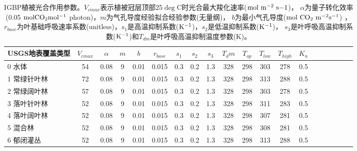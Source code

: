     \begin{sidewaystable}[]
        \centering
        \caption{IGBP植被光合作用参数。$V_{cmax}$表示植被冠层顶部25$\deg$C时光合最大羧化速率($\rm mol\ m^{-2}\ s{-1}$)，
        $\alpha$为量子转化效率(0.05 $\rm mol CO_2 mol^{-1}$ photon)，$m$为气孔导度经验拟合经验参数(无量纲)，
        $b$为最小气孔导度($\rm mol\ CO_2\ m^{-2}s^{-1}$) ，
        $r_{base}$为叶基础呼吸速率系数(unitless)，$s_1$是高温抑制系数($\rm K^{-1}$)，$s_2$是低温抑制系数($\rm K^{-1}$)，
        $s_3$是叶呼吸高温抑制系数($\rm K^{-1}$)和$T_{dm}$是叶呼吸高温抑制温度参数(K)。}
        \label{tab:IGBP植被光合作用参数1}
        \begin{tabular}{@{}lccccccccccccccccccc@{}}
        \toprule
        USGS地表覆盖类型     &$ V_{cmax}$ & $\alpha$ & $m$& $b$ & $r_{base}$ & $s_1$ & $s_2$ & $s_3$ & $T_dm$ & $T_{op}$ & $T_{low}$ & $T_{high}$ & $K_n$  \\ \midrule
        0 水体          & 54 & 0.08 & 9 & 0.01 & 0.015 & 0.3 & 0.2 & 1.3 & 328 & 298 & 303 & 278 & 0.5 \\
        1 常绿针叶林       & 72          & 0.08          & 9          & 0.01          & 0.015          & 0.3          & 0.2          & 1.3          & 328          & 298          & 313          & 288          & 0.5          \\
        2 常绿阔叶林       & 57          & 0.08          & 9          & 0.01          & 0.015          & 0.3          & 0.2          & 1.3          & 328          & 298          & 303          & 278          & 0.5          \\
        3 落叶针叶林       & 52          & 0.08          & 9          & 0.01          & 0.015          & 0.3          & 0.2          & 1.3          & 328          & 298          & 311          & 283          & 0.5          \\
        4 落叶阔叶林       & 52          & 0.08          & 9          & 0.01          & 0.015          & 0.3          & 0.2          & 1.3          & 328          & 298          & 307          & 281          & 0.5          \\
        5 混合林         & 52          & 0.08          & 9          & 0.01          & 0.015          & 0.3          & 0.2          & 1.3          & 328          & 298          & 308          & 281          & 0.5          \\
        6 郁闭灌丛        & 52          & 0.08          & 9          & 0.01          & 0.015          & 0.3          & 0.2          & 1.3          & 328          & 298          & 313          & 288          & 0.5          \\

\end{tabular}
\end{sidewaystable}
